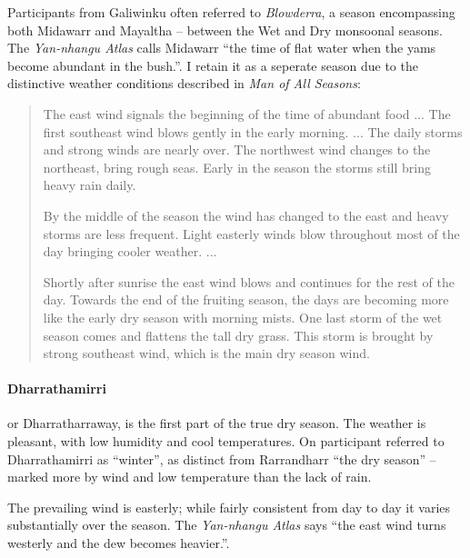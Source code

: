 Participants from Galiwinku often referred to \textit{Blowderra}, a season
encompassing both Midawarr and Mayaltha -- between the Wet and Dry monsoonal
seasons.  The \textit{Yan-nhangu Atlas} calls Midawarr ``the time of flat
water when the yams become abundant in the bush.''. I retain it as a
seperate season due to the distinctive weather conditions described in
\textit{Man of All Seasons}:
\begin{quote}
    The east wind signals the beginning of the time of abundant food ...
    The first southeast wind blows gently in the early morning. ...
    The daily storms and strong winds are nearly over.
    The northwest wind changes to the northeast, bring rough seas.
    Early in the season the storms still bring heavy rain daily.

    By the middle of the season the wind has changed to the east and
    heavy storms are less frequent.  Light easterly winds blow
    throughout most of the day bringing cooler weather. ...

    Shortly after sunrise the east wind blows and continues for the
    rest of the day.  Towards the end of the fruiting season, the days
    are becoming  more like the early dry season with morning mists.
    One last storm of the wet season comes and flattens the tall dry grass.
    This storm is brought by strong southeast wind, which is the main dry season wind.
\end{quote}


\paragraph{Dharrathamirri} or Dharratharraway, is the first part of the
true dry season.  The weather is pleasant, with low humidity and cool
temperatures.  On participant referred to Dharrathamirri as ``winter'',
as distinct from Rarrandharr ``the dry season'' -- marked more by wind
and low temperature than the lack of rain.

The prevailing wind is easterly; while fairly consistent from day to day
it varies substantially over the season.  The \textit{Yan-nhangu Atlas}
says ``the east wind turns westerly and the dew becomes heavier.''.

